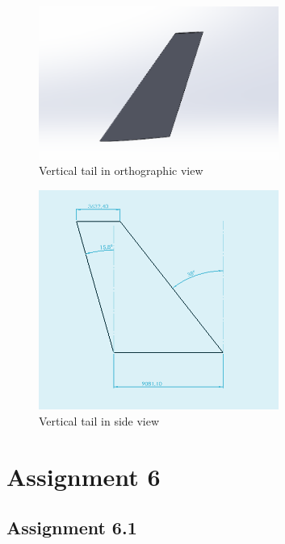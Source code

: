 \documentclass{article}
\begin{document}
\clearpage

\begin{figure}[h!]
    \centering
    \includegraphics[width=0.7\textwidth]{Sources/Plots_and_Pictures/vtail_cad.png}
    \caption{Vertical tail in orthographic view}
    \label{vertical_tail_CAD}
\end{figure}

\begin{figure}[h!]
    \centering
    \includegraphics[width=0.7\textwidth]{Sources/Plots_and_Pictures/vtailpianta.png}
    \caption{Vertical tail in side view}
    \label{vertical_tail_pianta}
\end{figure}

\clearpage
\section{Assignment 6\label{Assignment_6}}

\subsection{Assignment 6.1\label{Assignment_6.1}}
\end{document}
